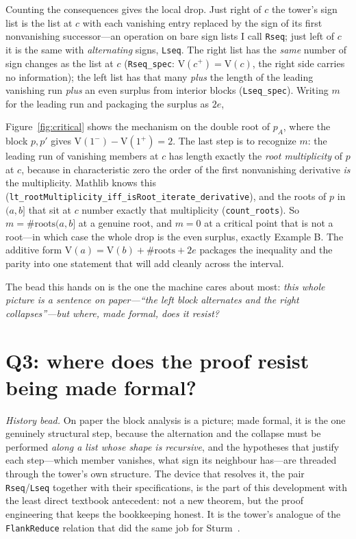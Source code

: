 \documentclass[11pt]{article}
\newcommand{\lean}[1]{\texttt{#1}}
\newcommand{\V}{\mathrm{V}}
\newcommand{\keyeq}[1]{\begin{center}\keybox{$\displaystyle #1$}\end{center}}
\begin{document}
Counting the consequences gives the local drop. Just right of $c$ the tower's sign list is the list
at $c$ with each vanishing entry replaced by the sign of its first nonvanishing successor---an
operation on bare sign lists I call \lean{Rseq}; just left of $c$ it is the same with
\emph{alternating} signs, \lean{Lseq}. The right list has the \emph{same} number of sign changes as
the list at $c$ (\lean{Rseq\_spec}: $\V(c^+)=\V(c)$, the right side carries no information); the left
list has that many \emph{plus} the length of the leading vanishing run \emph{plus} an even surplus
from interior blocks (\lean{Lseq\_spec}). Writing $m$ for the leading run and packaging the surplus
as $2e$,
\keyeq{\V(c^-)\ =\ \V(c^+)\ +\ m\ +\ 2e .}
Figure~\ref{fig:critical} shows the mechanism on the double root of $p_A$, where the block $p,p'$
gives $\V(1^-)-\V(1^+)=2$. The last step is to recognize $m$: the leading run of vanishing members at
$c$ has length exactly the \emph{root multiplicity} of $p$ at $c$, because in characteristic zero the
order of the first nonvanishing derivative \emph{is} the multiplicity. Mathlib knows this
(\lean{lt\_rootMultiplicity\_iff\_isRoot\_iterate\_derivative}), and the roots of $p$ in $(a,b]$ that
sit at $c$ number exactly that multiplicity (\lean{count\_roots}). So $m=\#\mathrm{roots}(a,b]$ at a
genuine root, and $m=0$ at a critical point that is not a root---in which case the whole drop is the
even surplus, exactly Example B. The additive form $\V(a)=\V(b)+\#\mathrm{roots}+2e$ packages the
inequality and the parity into one statement that will add cleanly across the interval.

The bead this hands on is the one the machine cares about most: \emph{this whole picture is a
sentence on paper---``the left block alternates and the right collapses''---but where, made formal,
does it resist?}

\section{Q3: where does the proof resist being made formal?}\label{sec:q3}

\emph{History bead.} On paper the block analysis is a picture; made formal, it is the one genuinely
structural step, because the alternation and the collapse must be performed \emph{along a list whose
shape is recursive}, and the hypotheses that justify each step---which member vanishes, what sign its
neighbour has---are threaded through the tower's own structure. The device that resolves it, the pair
\lean{Rseq}/\lean{Lseq} together with their specifications, is the part of this development with the
least direct textbook antecedent: not a new theorem, but the proof engineering that keeps the
bookkeeping honest. It is the tower's analogue of the \lean{FlankReduce} relation that did the same
job for Sturm~\cite{sturmlean}.
\end{document}
